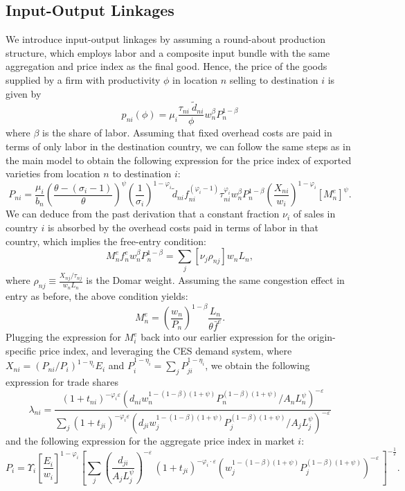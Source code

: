 \documentclass[12pt]{article}
\begin{document}
\subsection{Input-Output Linkages}
\label{app:io}
We introduce input-output linkages by assuming a round-about production structure, which employs labor and a composite input bundle with the same aggregation and price index as the final good.  Hence, the price of the goods supplied by a firm with productivity $\phi$  in location $n$  selling to destination $i$  is given by
\[
p_{ni}(\phi)=\mu_{i}\frac{\tau_{ni}\ \tilde{d}_{ni}}{\phi}w_{n}^{\beta}P_{n}^{1-\beta}
\]
where $\beta$ is the share of labor. Assuming that fixed overhead costs are paid in terms of only labor in the destination country, we can follow the same steps as in the main model to obtain the following expression for the price  index of exported varieties from location $n$  to destination $i$:
\[
P_{ni}=\frac{\mu_i}{b_{n}}\left(\frac{\theta-(\sigma_{i}-1)}{\theta}\right)^{\psi}\left(\frac{1}{\sigma_{i}}\right)^{1-\varphi_{i}}\tilde{d}_{ni}f_{ni}^{(\varphi_{i}-1)}\tau_{ni}^{\varphi_{i}}w_{n}^{\beta}P_{n}^{1-\beta}\left(\frac{X_{ni}}{w_{i}}\right)^{1-\varphi_{i}}\left[M_{n}^{e}\right]^{\psi}.
\]
We can deduce from the past derivation that a constant fraction $\nu_i$  of sales in country $i$  is absorbed by the overhead costs paid in terms of labor in that country, which implies the free-entry condition:
\[
M_{n}^{e}f_{n}^{e}w_{n}^{\beta}P_{n}^{1-\beta}=\sum_{j}\left[\nu_{j}\rho_{nj}\right]w_{n}L_{n},
\]
 where $\rho_{nj}\equiv\frac{X_{nj}/\tau_{nj}}{w_{n}L_{n}}$ is the Domar weight. Assuming the same congestion effect in entry as before, the above condition yields:
 \[
 M_{n}^{e}=\left(\frac{w_{n}}{P_{n}}\right)^{1-\beta}\frac{L_{n}}{\theta\bar{f}^{e}}.
 \]
 Plugging the expression for $M_{i}^{e}$ back into our earlier expression for the origin-specific price index, and leveraging the CES demand system, where $X_{ni}=(P_{ni}/P_{i})^{1-\eta_{i}}E_{i}$ and $P_{i}^{1-\eta_{i}}=\sum_{j}P_{ji}^{1-\eta_{i}}$, we obtain the following expression for trade shares
 \[
\lambda_{ni}=\frac{(1+t_{ni})^{-\varphi_{i}\varepsilon}\left(d_{ni}w_{n}^{1-(1-\beta)(1+\psi)}P_{n}^{(1-\beta)(1+\psi)}/A_{n}L_{n}^{\psi}\right)^{-\varepsilon}}{\sum_{j}(1+t_{ji})^{-\varphi_{i}\varepsilon}\left(d_{ji}w_{j}^{1-(1-\beta)(1+\psi)}P_{j}^{(1-\beta)(1+\psi)}/A_{j}L_{j}^{\psi}\right)^{-\varepsilon}}
 \]
 and the following expression for the aggregate price index in market $i$:
 \[
P_{i}=\Upsilon_{i}\left[\frac{E_{i}}{w_{i}}\right]^{1-\varphi_{i}}\left[\sum_{j}\left(\frac{d_{ji}}{A_{j}L_{j}^{\psi}}\right)^{-\varepsilon}\,(1+t_{ji})^{-\varphi_{i}\cdot\varepsilon}\left(w_{j}^{1-(1-\beta)(1+\psi)}P_{j}^{(1-\beta)(1+\psi)}\right)^{-\varepsilon}\,\right]^{-\frac{1}{\varepsilon}}.
 \]
\end{document}
